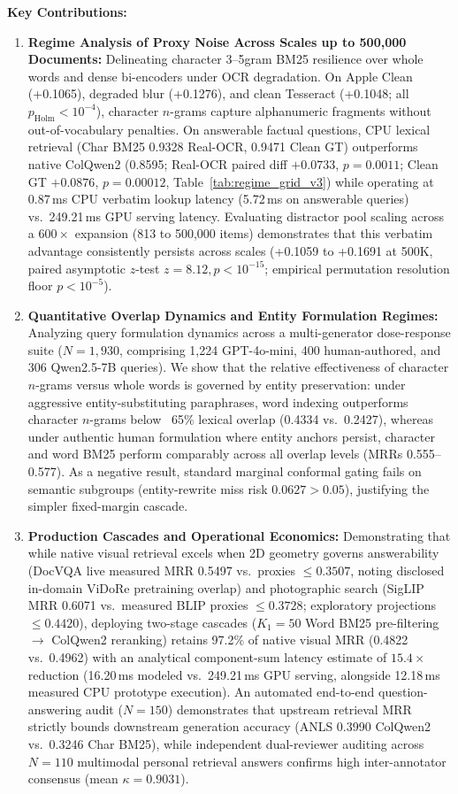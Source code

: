 \textbf{Key Contributions:}
\begin{enumerate}
    \setlength{\itemsep}{0pt}
    \setlength{\parskip}{0pt}
    \setlength{\parsep}{0pt}
    \setlength{\topsep}{1pt}
    \item \textbf{Regime Analysis of Proxy Noise Across Scales up to 500,000 Documents:} Delineating character 3--5gram BM25 resilience over whole words and dense bi-encoders under OCR degradation. On Apple Clean (+0.1065), degraded blur (+0.1276), and clean Tesseract (+0.1048; all $p_{\text{Holm}} < 10^{-4}$), character $n$-grams capture alphanumeric fragments without out-of-vocabulary penalties. On answerable factual questions, CPU lexical retrieval (Char BM25 0.9328 Real-OCR, 0.9471 Clean GT) outperforms native ColQwen2 (0.8595; Real-OCR paired diff $+0.0733$, $p = 0.0011$; Clean GT $+0.0876$, $p = 0.00012$, Table~\ref{tab:regime_grid_v3}) while operating at 0.87\,ms CPU verbatim lookup latency (5.72\,ms on answerable queries) vs.\ 249.21\,ms GPU serving latency. Evaluating distractor pool scaling across a $600\times$ expansion (813 to 500,000 items) demonstrates that this verbatim advantage consistently persists across scales (+0.1059 to +0.1691 at 500K, paired asymptotic $z$-test $z=8.12, p < 10^{-15}$; empirical permutation resolution floor $p < 10^{-5}$).
    \item \textbf{Quantitative Overlap Dynamics and Entity Formulation Regimes:} Analyzing query formulation dynamics across a multi-generator dose-response suite ($N=1{,}930$, comprising 1,224 GPT-4o-mini, 400 human-authored, and 306 Qwen2.5-7B queries). We show that the relative effectiveness of character $n$-grams versus whole words is governed by entity preservation: under aggressive entity-substituting paraphrases, word indexing outperforms character $n$-grams below ~65\% lexical overlap (0.4334 vs.\ 0.2427), whereas under authentic human formulation where entity anchors persist, character and word BM25 perform comparably across all overlap levels (MRRs 0.555--0.577). As a negative result, standard marginal conformal gating fails on semantic subgroups (entity-rewrite miss risk $0.0627 > 0.05$), justifying the simpler fixed-margin cascade.
    \item \textbf{Production Cascades and Operational Economics:} Demonstrating that while native visual retrieval excels when 2D geometry governs answerability (DocVQA live measured MRR 0.5497 vs.\ proxies $\le 0.3507$, noting disclosed in-domain ViDoRe pretraining overlap) and photographic search (SigLIP MRR 0.6071 vs.\ measured BLIP proxies $\le 0.3728$; exploratory projections $\le 0.4420$), deploying two-stage cascades ($K_1=50$ Word BM25 pre-filtering $\to$ ColQwen2 reranking) retains 97.2\% of native visual MRR (0.4822 vs.\ 0.4962) with an analytical component-sum latency estimate of $15.4\times$ reduction (16.20\,ms modeled vs.\ 249.21\,ms GPU serving, alongside 12.18\,ms measured CPU prototype execution). An automated end-to-end question-answering audit ($N=150$) demonstrates that upstream retrieval MRR strictly bounds downstream generation accuracy (ANLS 0.3990 ColQwen2 vs.\ 0.3246 Char BM25), while independent dual-reviewer auditing across $N=110$ multimodal personal retrieval answers confirms high inter-annotator consensus (mean $\kappa = 0.9031$).

\end{enumerate}
